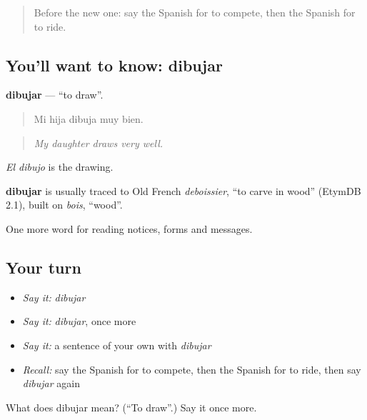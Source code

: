 \label{lesson:ES-C498-dibujar}



\begin{quote}
Before the new one: say the Spanish for to compete, then the Spanish for to ride.
\end{quote}

\subsection*{You'll want to know: dibujar}
\textbf{dibujar} — \textquotedblleft{}to draw\textquotedblright{}.

\begin{quote}
Mi hija dibuja muy bien.
\end{quote}

\begin{quote}
\emph{My daughter draws very well.}
\end{quote}

\emph{El dibujo} is the drawing.

\begin{cousinweb}
\textbf{dibujar} is usually traced to Old French \emph{deboissier}, \textquotedblleft{}to carve in wood\textquotedblright{} (EtymDB 2.1), built on \emph{bois}, \textquotedblleft{}wood\textquotedblright{}.
\end{cousinweb}

\begin{grammarlens}[title={What you've built}]
One more word for reading notices, forms and messages.
\end{grammarlens}

\subsection*{Your turn}
\begin{itemize}
\raggedright
  \item \emph{Say it:} \emph{dibujar}
  \item \emph{Say it:} \emph{dibujar}, once more
  \item \emph{Say it:} a sentence of your own with \emph{dibujar}
  \item \emph{Recall:} say the Spanish for to compete, then the Spanish for to ride, then say \emph{dibujar} again
\end{itemize}

\begin{tcolorbox}[breakable,colback=teal!4,colframe=teal!35!black,title={Before you move on}]
What does dibujar mean? (\textquotedblleft{}To draw\textquotedblright{}.) Say it once more.
\end{tcolorbox}
